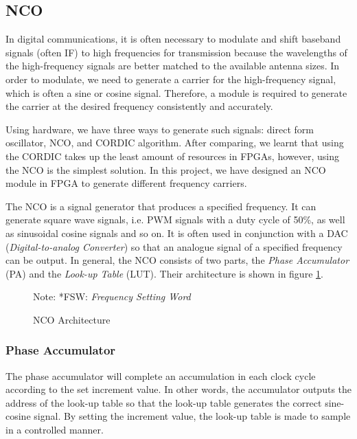 \subsection{NCO}
In digital communications, it is often necessary to modulate and shift baseband signals (often IF) to high frequencies for transmission because the wavelengths of the high-frequency signals are better matched to the available antenna sizes. In order to modulate, we need to generate a carrier for the high-frequency signal, which is often a sine or cosine signal. Therefore, a module is required to generate the carrier at the desired frequency consistently and accurately.

Using hardware, we have three ways to generate such signals: direct form oscillator, NCO, and CORDIC algorithm. After comparing, we learnt that using the CORDIC takes up the least amount of resources in FPGAs\cite{RN181}, however, using the NCO is the simplest solution. In this project, we have designed an NCO module in FPGA to generate different frequency carriers.

The NCO is a signal generator that produces a specified frequency. It can generate square wave signals, i.e. PWM signals with a duty cycle of 50\%, as well as sinusoidal cosine signals and so on\cite{RN189}. It is often used in conjunction with a DAC (\textit{Digital-to-analog Converter}) so that an analogue signal of a specified frequency can be output. In general, the NCO consists of two parts, the \textit{Phase Accumulator} (PA) and the \textit{Look-up Table} (LUT)\cite{RN191-1}. Their architecture is shown in figure \ref{fig:nco}.

\begin{figure}[!h]
    \centering
    
    \caption{NCO Architecture}
    \label{fig:nco}
    \footnotesize Note: *FSW: \textit{Frequency Setting Word}
\end{figure}

\subsubsection{Phase Accumulator} \label{subsec:pa_subsubsection}
The phase accumulator will complete an accumulation in each clock cycle according to the set increment value. In other words, the accumulator outputs the address of the look-up table so that the look-up table generates the correct sine-cosine signal\cite{RN191}. By setting the increment value, the look-up table is made to sample in a controlled manner.

